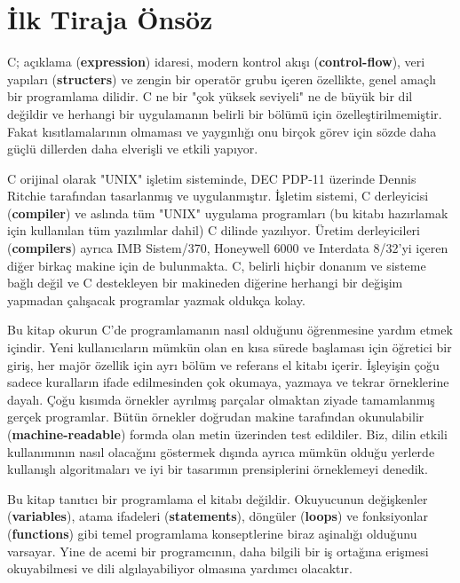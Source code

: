 \documentclass[a4paper,12pt,oneside]{book}
\begin{document}
\chapter*{İlk Tiraja Önsöz}

C; açıklama (\textbf{expression}) idaresi, modern kontrol akışı (\textbf{control-flow}), veri yapıları (\textbf{structers}) ve zengin bir operatör grubu içeren özellikte, genel amaçlı bir programlama dilidir. C ne bir "çok yüksek seviyeli" ne de büyük bir dil değildir ve herhangi bir uygulamanın belirli bir bölümü için özelleştirilmemiştir. Fakat kısıtlamalarının olmaması ve yaygınlığı onu birçok görev için sözde daha güçlü dillerden daha elverişli ve etkili yapıyor.
\par C orijinal olarak "UNIX" işletim sisteminde, DEC PDP-11 üzerinde Dennis Ritchie tarafından tasarlanmış ve uygulanmıştır. İşletim sistemi, C derleyicisi (\textbf{compiler}) ve aslında tüm "UNIX" uygulama programları (bu kitabı hazırlamak için kullanılan tüm yazılımlar dahil) C dilinde yazılıyor. Üretim derleyicileri (\textbf{compilers}) ayrıca IMB Sistem/370, Honeywell 6000 ve Interdata 8/32'yi içeren diğer birkaç makine için de bulunmakta. C, belirli hiçbir donanım ve sisteme bağlı değil ve C destekleyen bir makineden diğerine herhangi bir değişim yapmadan çalışacak programlar yazmak oldukça kolay.
\par Bu kitap okurun C'de programlamanın nasıl olduğunu öğrenmesine yardım etmek içindir. Yeni kullanıcıların mümkün olan en kısa sürede başlaması için öğretici bir giriş, her majör özellik için ayrı bölüm ve referans el kitabı içerir. İşleyişin çoğu sadece kuralların ifade edilmesinden çok okumaya, yazmaya ve tekrar örneklerine dayalı. Çoğu kısımda örnekler ayrılmış parçalar olmaktan ziyade tamamlanmış gerçek programlar. Bütün örnekler doğrudan makine tarafından okunulabilir (\textbf{machine-readable}) formda olan metin üzerinden test edildiler. Biz, dilin etkili kullanımının nasıl olacağını göstermek dışında ayrıca mümkün olduğu yerlerde kullanışlı algoritmaları ve iyi bir tasarımın prensiplerini örneklemeyi denedik.
\par Bu kitap tanıtıcı bir programlama el kitabı değildir. Okuyucunun değişkenler (\textbf{variables}), atama ifadeleri (\textbf{statements}), döngüler (\textbf{loops}) ve fonksiyonlar (\textbf{functions}) gibi temel programlama konseptlerine biraz aşinalığı olduğunu varsayar. Yine de acemi bir programcının, daha bilgili bir iş ortağına erişmesi okuyabilmesi ve dili algılayabiliyor olmasına yardımcı olacaktır. \pagebreak
\end{document}
